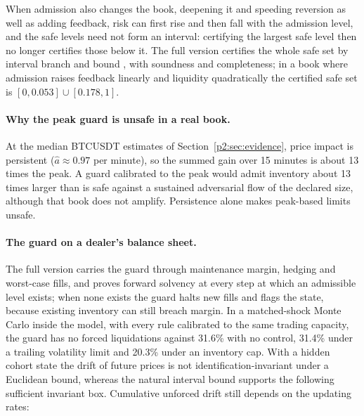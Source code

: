     When admission also changes the book, deepening it and speeding reversion as well as adding feedback, risk can first rise and then fall with the admission level, and the safe levels need not form an interval: certifying the largest safe level then no longer certifies those below it. The full version certifies the whole safe set by interval branch and bound \citep{p2:hansen2004}, with soundness and completeness; in a book where admission raises feedback linearly and liquidity quadratically the certified safe set is $[0,0.053]\cup[0.178,1]$.

    \paragraph{Why the peak guard is unsafe in a real book.} At the median BTCUSDT estimates of Section~\ref{p2:sec:evidence}, price impact is persistent ($\hat a\approx0.97$ per minute), so the summed gain over 15 minutes is about 13 times the peak. A guard calibrated to the peak would admit inventory about 13 times larger than is safe against a sustained adversarial flow of the declared size, although that book does not amplify. Persistence alone makes peak-based limits unsafe.

    \paragraph{The guard on a dealer's balance sheet.} The full version carries the guard through maintenance margin, hedging and worst-case fills, and proves forward solvency at every step at which an admissible level exists; when none exists the guard halts new fills and flags the state, because existing inventory can still breach margin. In a matched-shock Monte Carlo inside the model, with every rule calibrated to the same trading capacity, the guard has no forced liquidations against 31.6\% with no control, 31.4\% under a trailing volatility limit and 20.3\% under an inventory cap. With a hidden cohort state the drift of future prices is not identification-invariant under a Euclidean bound, whereas the natural interval bound supports the following sufficient invariant box. Cumulative unforced drift still depends on the updating rates:
    
